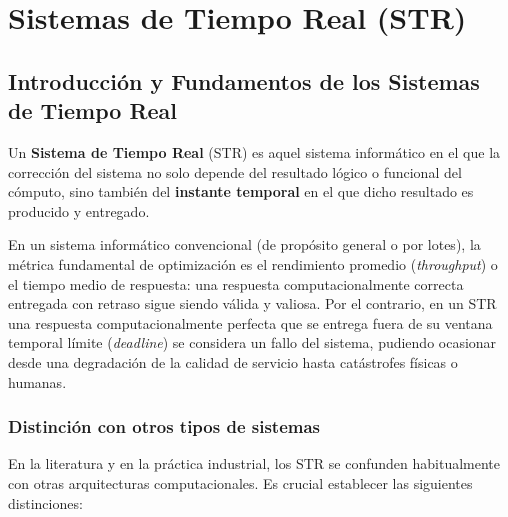 \chapter{Sistemas de Tiempo Real (STR)}
\label{cap:tema4}


\section{Introducción y Fundamentos de los Sistemas de Tiempo Real}

\begin{definicion}
Un \textbf{Sistema de Tiempo Real} (STR) es aquel sistema informático en el que la corrección del sistema no solo depende del resultado lógico o funcional del cómputo, sino también del \textbf{instante temporal} en el que dicho resultado es producido y entregado.
\end{definicion}

En un sistema informático convencional (de propósito general o por lotes), la métrica fundamental de optimización es el rendimiento promedio (\textit{throughput}) o el tiempo medio de respuesta: una respuesta computacionalmente correcta entregada con retraso sigue siendo válida y valiosa. Por el contrario, en un STR una respuesta computacionalmente perfecta que se entrega fuera de su ventana temporal límite (\textit{deadline}) se considera un fallo del sistema, pudiendo ocasionar desde una degradación de la calidad de servicio hasta catástrofes físicas o humanas.

\subsection{Distinción con otros tipos de sistemas}
En la literatura y en la práctica industrial, los STR se confunden habitualmente con otras arquitecturas computacionales. Es crucial establecer las siguientes distinciones:

